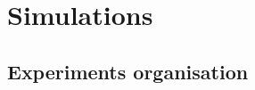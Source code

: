 \chapter{Simulations}
\label{chapter:simulations}

\lipsum[1]


\section{Experiments organisation}
\label{section:experiments}

\lipsum[1]

